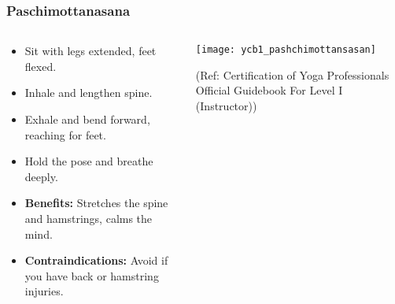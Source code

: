 \begin{frame}[fragile]\frametitle{Paschimottanasana}
\begin{columns}
    \begin{column}[T]{0.5\linewidth}
      \begin{itemize}
        \item Sit with legs extended, feet flexed.
        \item Inhale and lengthen spine.
        \item Exhale and bend forward, reaching for feet.
        \item Hold the pose and breathe deeply.
        \item \textbf{Benefits:} Stretches the spine and hamstrings, calms the mind.
        \item \textbf{Contraindications:} Avoid if you have back or hamstring injuries.
      \end{itemize}
    \end{column}
    \begin{column}[T]{0.5\linewidth}
        \begin{center}
        \begin{center}
		        \texttt{[image: ycb1\_pashchimottansasan]}
				
				{\tiny (Ref: Certification  of Yoga Professionals Official Guidebook For Level I (Instructor))}	        
		\end{center}   
        \end{center}    
    \end{column}
  \end{columns}
\end{frame}

